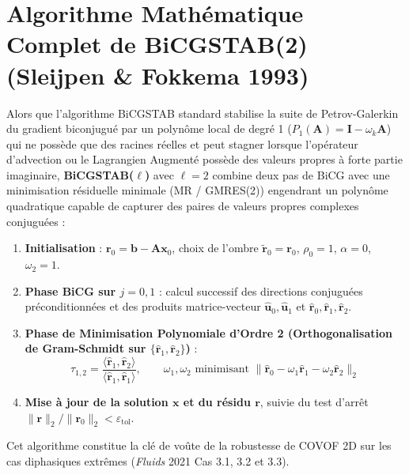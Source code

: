\documentclass[10pt,a4paper,oneside]{book}
\begin{document}
\section{Algorithme Mathématique Complet de BiCGSTAB(2) (Sleijpen \& Fokkema 1993)}
Alors que l'algorithme BiCGSTAB standard stabilise la suite de Petrov-Galerkin du gradient biconjugué par un polynôme local de degré 1 ($P_1(\mathbf{A}) = \mathbf{I} - \omega_k \mathbf{A}$) qui ne possède que des racines réelles et peut stagner lorsque l'opérateur d'advection ou le Lagrangien Augmenté possède des valeurs propres à forte partie imaginaire, \textbf{BiCGSTAB($\ell$)} avec $\ell = 2$ combine deux pas de BiCG avec une minimisation résiduelle minimale (MR / GMRES(2)) engendrant un polynôme quadratique capable de capturer des paires de valeurs propres complexes conjuguées :
\begin{enumerate}
  \item \textbf{Initialisation} : $\mathbf{r}_0 = \mathbf{b} - \mathbf{A}\mathbf{x}_0$, choix de l'ombre $\tilde{\mathbf{r}}_0 = \mathbf{r}_0$, $\rho_0 = 1$, $\alpha = 0$, $\omega_2 = 1$.
  \item \textbf{Phase BiCG sur $j = 0, 1$} : calcul successif des directions conjuguées préconditionnées et des produits matrice-vecteur $\hat{\mathbf{u}}_0, \hat{\mathbf{u}}_1$ et $\hat{\mathbf{r}}_0, \hat{\mathbf{r}}_1, \hat{\mathbf{r}}_2$.
  \item \textbf{Phase de Minimisation Polynomiale d'Ordre 2 (Orthogonalisation de Gram-Schmidt sur $\{\hat{\mathbf{r}}_1, \hat{\mathbf{r}}_2\}$)} :
  \begin{equation}
    \tau_{1,2} = \frac{\langle \hat{\mathbf{r}}_1, \hat{\mathbf{r}}_2 \rangle}{\langle \hat{\mathbf{r}}_1, \hat{\mathbf{r}}_1 \rangle}, \qquad \omega_1, \omega_2 \text{ minimisant } \|\hat{\mathbf{r}}_0 - \omega_1 \hat{\mathbf{r}}_1 - \omega_2 \hat{\mathbf{r}}_2\|_2
  \end{equation}
  \item \textbf{Mise à jour de la solution $\mathbf{x}$ et du résidu $\mathbf{r}$}, suivie du test d'arrêt $\|\mathbf{r}\|_2 / \|\mathbf{r}_0\|_2 < \varepsilon_{\text{tol}}$.
\end{enumerate}
Cet algorithme constitue la clé de voûte de la robustesse de COVOF 2D sur les cas diphasiques extrêmes (\emph{Fluids} 2021 Cas 3.1, 3.2 et 3.3).
\end{document}
